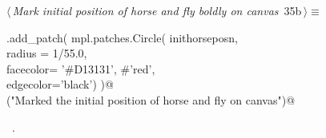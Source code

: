 \documentclass[11.5pt]{report}
\begin{document}
\begin{flushleft}
\begin{list}{}{\setlength{\itemsep}{-\parsep}\setlength{\itemindent}{-\leftmargin}}
\item{}
\end{list}
\vspace{4ex}
\end{flushleft}

\vspace{-0.8cm}\newchunk 

\begin{flushleft} \small\label{scrap41}\raggedright\small
{} $\langle\,${\itshape Mark initial position of horse and fly boldly on canvas}\nobreak\ {\footnotesize {35b}}$\,\rangle\equiv$
\vspace{-1ex}
\begin{list}{}{} \item
\mbox{}\verb@ax.add_patch( mpl.patches.Circle( inithorseposn, \@\\
\mbox{}\verb@                                  radius = 1/55.0,\@\\
\mbox{}\verb@                                  facecolor= '#D13131', #'red',\@\\
\mbox{}\verb@                                  edgecolor='black')  )@\\
\mbox{}\verb@debug("Marked the initial position of horse and fly on canvas")@\\
\mbox{}\verb@@{\NWsep}
\end{list}
\vspace{-1.5ex}
\footnotesize
\begin{list}{}{\setlength{\itemsep}{-\parsep}\setlength{\itemindent}{-\leftmargin}}
\item \NWtxtMacroRefIn\ .

\item{}
\end{list}
\vspace{4ex}
\end{flushleft}
\end{document}
